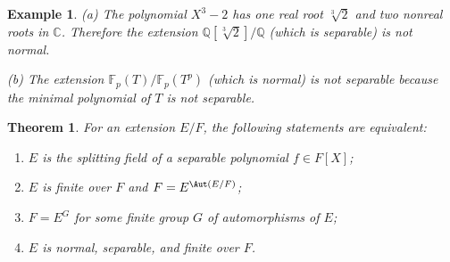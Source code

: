 \documentclass[a4paper,11pt,final,openany]{memoir}
\newtheorem{theorem}[X]{Theorem}
\newtheorem{example}[X]{Example}
\theoremstyle{nonumberplain}
\begin{document}
\begin{example}
\label{ft11}(a) The polynomial $X^{3}-2{}$ has one real root $\sqrt[3]{2}$ and
two nonreal roots in $\mathbb{C}{}$. Therefore the extension $\mathbb{Q}%
[\sqrt[3]{2}]/\mathbb{Q}{}$ (which is separable) is not normal.

(b) The extension $\mathbb{F}_{p}(T)/\mathbb{F}_{p}(T^{p})$ (which is normal)
is not separable because the minimal polynomial of $T$ is not separable.
\end{example}

\begin{theorem}
\label{ft12}%
%
For an extension $E/F$, the following statements are equivalent:

\begin{enumerate}
\item $E$ is the splitting field of a separable polynomial $f\in F[X]$;

\item $E$ is finite over $F$ and $F=E^{\Aut(E/F)}$;

\item $F=E^{G}$ for some finite group $G$ of automorphisms of $E$;

\item $E$ is normal, separable, and finite over $F$.
\end{enumerate}
\end{theorem}
\end{document}
